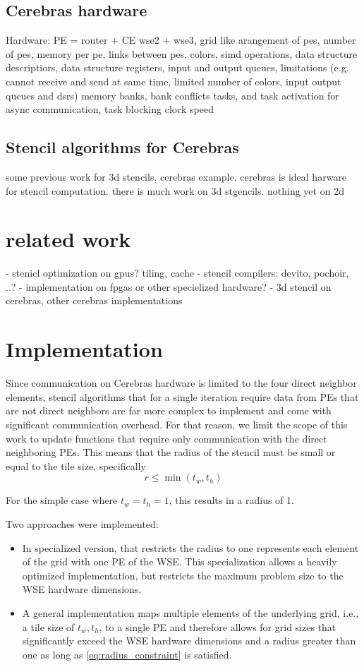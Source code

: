 \documentclass{article}
\begin{document}
\subsection{Cerebras hardware}
Hardware: PE = router + CE
wse2 + wse3, grid like arangement of pes, number of pes, memory per pe, links between pes, colors, simd operations, data structure descriptiors, data structure registers, input and output queues, limitations (e.g. cannot receive and send at same time, limited number of colors, input output queues and dsrs)
memory banks, bank conflicts
tasks, and task activation for async communication, task blocking
clock speed
\subsection{Stencil algorithms for Cerebras}
some previous work for 3d stencils, cerebras example.
cerebras is ideal harware for stencil computation. 
there is much work on 3d stgencils. nothing yet on 2d
\section{related work}
- stenicl optimization on gpus? tiling, cache
- stencil compilers: devito, pochoir, ..?
- implementation on fpgas or other specielized hardware?
- 3d stencil on cerebras, other cerebras implementations



\section{Implementation}
Since communication on Cerebras hardware is limited to the four direct neighbor elements, stencil algorithms that for a single iteration require data from PEs that are not direct neighbors are far more complex to implement and come with significant communication overhead. For that reason, we limit the scope of this work to update functions that require only communication with the direct neighboring PEs. This means that the radius of the stencil must be small or equal to the tile size, specifically
\begin{equation}    
\label{eq:radius_constraint}
r \leq \min(t_w, t_h)
\end{equation}

For the simple case where $t_w=t_h=1$, this results in a radius of 1.

Two approaches were implemented:
\begin{itemize}
    \item In specialized version, that restricts the radius to one represents each element of the grid with one PE of the WSE. This specialization allows a heavily optimized implementation, but restricts the maximum problem size to the WSE hardware dimensions.
    \item A general implementation maps multiple elements of the underlying grid, i.e., a tile size of $t_w, t_h$, to a single PE and therefore allows for grid sizes that significantly exceed the WSE hardware dimensions and a radius greater than one as long as \ref{eq:radius_constraint} is satisfied. 
\end{itemize}
\end{document}
